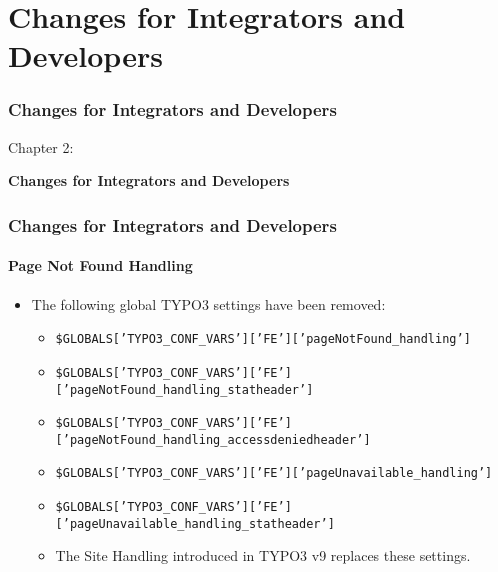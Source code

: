 %

\section{Changes for Integrators and Developers}
\begin{frame}[fragile]
	\frametitle{Changes for Integrators and Developers}

	\begin{center}\huge{Chapter 2:}\end{center}
	\begin{center}\huge{\color{typo3darkgrey}\textbf{Changes for Integrators and Developers}}\end{center}

\end{frame}


\begin{frame}[fragile]
	\frametitle{Changes for Integrators and Developers}
	\framesubtitle{Page Not Found Handling}

	\begin{itemize}

		\item The following global TYPO3 settings have been removed:

			\begin{itemize}
				\item {\fontsize{7}{8}\selectfont\texttt{\$GLOBALS['TYPO3\_CONF\_VARS']['FE']['pageNotFound\_handling']}}
				\item {\fontsize{7}{8}\selectfont\texttt{\$GLOBALS['TYPO3\_CONF\_VARS']['FE']['pageNotFound\_handling\_statheader']}}
				\item {\fontsize{7}{8}\selectfont\texttt{\$GLOBALS['TYPO3\_CONF\_VARS']['FE']['pageNotFound\_handling\_accessdeniedheader']}}
				\item {\fontsize{7}{8}\selectfont\texttt{\$GLOBALS['TYPO3\_CONF\_VARS']['FE']['pageUnavailable\_handling']}}
				\item {\fontsize{7}{8}\selectfont\texttt{\$GLOBALS['TYPO3\_CONF\_VARS']['FE']['pageUnavailable\_handling\_statheader']}}
			\end{itemize}

			\begin{itemize}\smaller
				\item[\ding{228}] The Site Handling introduced in TYPO3 v9 replaces these settings.
			\end{itemize}\normalsize

	\end{itemize}

\end{frame}

